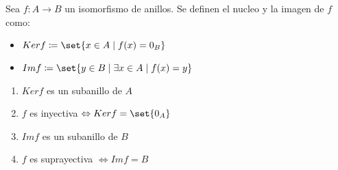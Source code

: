 \begin{definition}
	Sea \(f \colon A \to B \) un isomorfismo de anillos. Se definen el nucleo y la imagen de \(f \) como:
	\begin{itemize}
		\item \(Kerf \coloneqq \set{x \in A \mid f(x) = 0_B }\)
		\item \(Imf \coloneqq \set{y \in B \mid \exists x \in A \mid f(x) = y }\)
	\end{itemize}
\end{definition}

\begin{proposition}
	\begin{enumerate}
		\item \(Kerf \) es un subanillo de \(A \)
		\item \(f \) es inyectiva \(\iff Kerf = \set{0_A}\)
		\item \(Imf \) es un subanillo de \(B \)
		\item \(f \) es suprayectiva \(\iff  Imf = B \)
	\end{enumerate}
\end{proposition}
